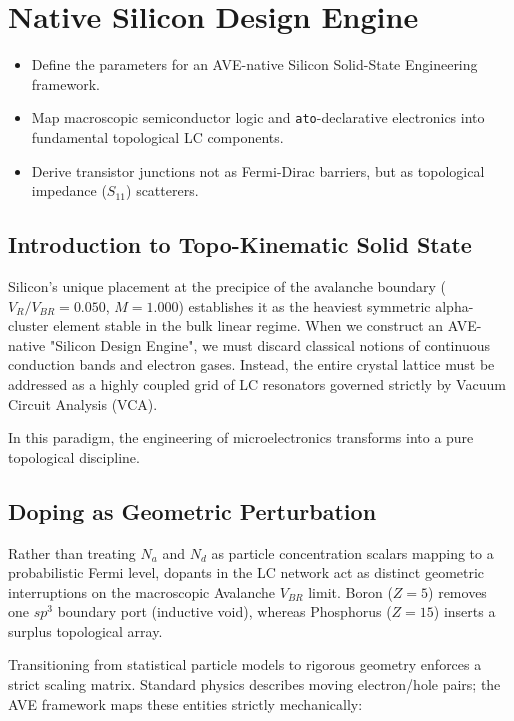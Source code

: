 \chapter{Native Silicon Design Engine}
\label{ch:silicon_design_engine}

\begin{objectivebox}
\begin{itemize}
    \item Define the parameters for an AVE-native Silicon Solid-State Engineering framework.
    \item Map macroscopic semiconductor logic and \texttt{ato}-declarative electronics into fundamental topological LC components.
    \item Derive transistor junctions not as Fermi-Dirac barriers, but as topological impedance ($S_{11}$) scatterers.
\end{itemize}
\end{objectivebox}

\section{Introduction to Topo-Kinematic Solid State}
Silicon's unique placement at the precipice of the avalanche boundary ($V_R/V_{BR} = 0.050$, $M=1.000$) establishes it as the heaviest symmetric alpha-cluster element stable in the bulk linear regime. When we construct an AVE-native "Silicon Design Engine", we must discard classical notions of continuous conduction bands and electron gases. Instead, the entire crystal lattice must be addressed as a highly coupled grid of LC resonators governed strictly by Vacuum Circuit Analysis (VCA).

In this paradigm, the engineering of microelectronics transforms into a pure topological discipline.

\section{Doping as Geometric Perturbation}
Rather than treating $N_a$ and $N_d$ as particle concentration scalars mapping to a probabilistic Fermi level, dopants in the LC network act as distinct geometric interruptions on the macroscopic Avalanche $V_{BR}$ limit. Boron ($Z=5$) removes one $sp^3$ boundary port (inductive void), whereas Phosphorus ($Z=15$) inserts a surplus topological array. 

Transitioning from statistical particle models to rigorous geometry enforces a strict scaling matrix. Standard physics describes moving electron/hole pairs; the AVE framework maps these entities strictly mechanically:

